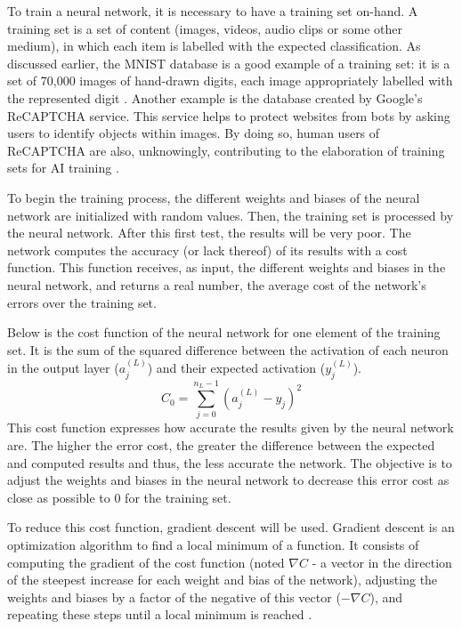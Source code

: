 \documentclass[12pt,a4paper,notitlepage]{article}
\begin{document}
To train a neural network, it is necessary to have a training set on-hand. A training set is a set of content (images, videos, audio clips or some other medium), in which each item is labelled with the expected classification. As discussed earlier, the MNIST database is a good example of a training set: it is a set of 70,000 images of hand-drawn digits, each image appropriately labelled with the represented digit \cite{lecun_mnist_1998}. Another example is the database created by Google's ReCAPTCHA service. This service helps to protect websites from bots by asking users to identify objects within images. By doing so, human users of ReCAPTCHA are also, unknowingly, contributing to the elaboration of training sets for AI training \cite{maruzani_are_2021}.

To begin the training process, the different weights and biases of the neural network are initialized with random values. Then, the training set is processed by the neural network. After this first test, the results will be very poor. The network computes the accuracy (or lack thereof) of its results with a cost function. This function receives, as input, the different weights and biases in the neural network, and returns a real number, the average cost of the network's errors over the training set.

Below is the cost function of the neural network for one element of the training set. It is the sum of the squared difference between the activation of each neuron in the output layer (\(a_{j}^{(L)}\)) and their expected activation (\(y_{j}^{(L)}\)).
\begin{displaymath}
	C_{0} = \sum_{j=0}^{n_{L} - 1} (a_{j}^{(L)} - y_{j})^{2}
\end{displaymath}
This cost function expresses how accurate the results given by the neural network are. The higher the error cost, the greater the difference between the expected and computed results and thus, the less accurate the network. The objective is to adjust the weights and biases in the neural network to decrease this error cost as close as possible to 0 for the training set.

To reduce this cost function, gradient descent will be used. Gradient descent is an optimization algorithm to find a local minimum of a function. It consists of computing the gradient of the cost function (noted \(\nabla C\) - a vector in the direction of the steepest increase for each weight and bias of the network), adjusting the weights and biases by a factor of the negative of this vector (\(-\nabla C\)), and repeating these steps until a local minimum is reached \cite{sanderson_gradient_2017}.
\end{document}
